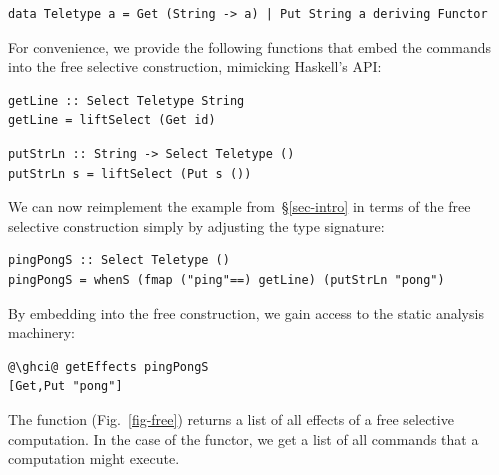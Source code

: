 \vspace{1mm}
\begin{verbatim}
data Teletype a = Get (String -> a) | Put String a deriving Functor
\end{verbatim}
\vspace{1mm}

\noindent
For convenience, we provide the following functions that embed the commands into
the free selective construction, mimicking Haskell's  API:

\vspace{1mm}
\begin{verbatim}
getLine :: Select Teletype String
getLine = liftSelect (Get id)
\end{verbatim}
\vspace{1mm}
\begin{verbatim}
putStrLn :: String -> Select Teletype ()
putStrLn s = liftSelect (Put s ())
\end{verbatim}
\vspace{1mm}

\noindent
We can now reimplement the  example from~\S\ref{sec-intro} in
terms of the free selective construction simply by adjusting the type signature:

\vspace{1mm}
\begin{verbatim}
pingPongS :: Select Teletype ()
pingPongS = whenS (fmap ("ping"==) getLine) (putStrLn "pong")
\end{verbatim}
\vspace{1mm}

\noindent
By embedding  into the free construction, we gain access to the
static analysis machinery:

\vspace{1mm}
\begin{verbatim}
@\ghci@ getEffects pingPongS
[Get,Put "pong"]
\end{verbatim}
\vspace{1mm}

\noindent
The  function (Fig.~\ref{fig-free}) returns a list of all effects
of a free selective computation. In the case of the  functor, we
get a list of all commands that a computation might execute.



